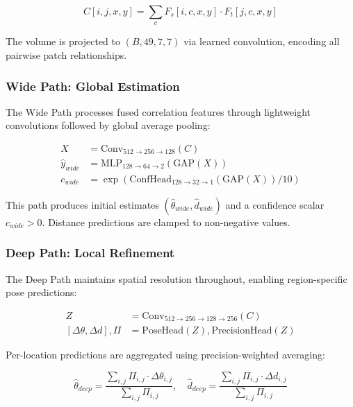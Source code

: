 \documentclass[sigconf,nonacm]{acmart}
\begin{document}
\begin{equation}
C[i,j,x,y] = \sum_{c} F_s[i,c,x,y] \cdot F_t[j,c,x,y]
\end{equation}

The volume is projected to $(B, 49, 7, 7)$ via learned convolution, encoding all pairwise patch relationships.

\subsubsection{Wide Path: Global Estimation}

The Wide Path processes fused correlation features through lightweight convolutions followed by global average pooling:

\begin{align}
X &= \text{Conv}_{512 \rightarrow 256 \rightarrow 128}(C) \\
\hat{y}_{wide} &= \text{MLP}_{128 \rightarrow 64 \rightarrow 2}(\text{GAP}(X)) \\
c_{wide} &= \exp(\text{ConfHead}_{128 \rightarrow 32 \rightarrow 1}(\text{GAP}(X)) / 10)
\end{align}

This path produces initial estimates $(\hat{\theta}_{wide}, \hat{d}_{wide})$ and a confidence scalar $c_{wide} > 0$. Distance predictions are clamped to non-negative values.

\subsubsection{Deep Path: Local Refinement}

The Deep Path maintains spatial resolution throughout, enabling region-specific pose predictions:

\begin{align}
Z &= \text{Conv}_{512 \rightarrow 256 \rightarrow 128 \rightarrow 256}(C) \\
[\Delta\theta, \Delta d], \Pi &= \text{PoseHead}(Z), \text{PrecisionHead}(Z)
\end{align}

Per-location predictions are aggregated using precision-weighted averaging:

\begin{equation}
\hat{\theta}_{deep} = \frac{\sum_{i,j} \Pi_{i,j} \cdot \Delta\theta_{i,j}}{\sum_{i,j} \Pi_{i,j}}, \quad
\hat{d}_{deep} = \frac{\sum_{i,j} \Pi_{i,j} \cdot \Delta d_{i,j}}{\sum_{i,j} \Pi_{i,j}}
\end{equation}
\end{document}
